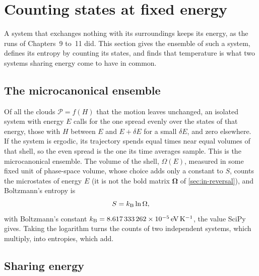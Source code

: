\section{Counting states at fixed energy}
\label{sec:sm-micro}

A system that exchanges nothing with its surroundings keeps its energy,
as the runs of Chapters~9 to~11 did. This section gives the ensemble of
such a system, defines its entropy by counting its states, and finds that
temperature is what two systems sharing energy come to have in common.

\subsection*{The microcanonical ensemble}

Of all the clouds $\mathcal{P} = f(H)$ that the motion leaves unchanged, an
isolated system with energy $E$ calls for the one spread evenly over the
states of that energy, those with $H$ between $E$ and $E + \delta E$ for a
small $\delta E$, and zero elsewhere. If the system is ergodic, its
trajectory spends equal times near equal volumes of that shell, so the
even spread is the one its time averages sample. This is the
microcanonical ensemble. The volume of the shell, $\Omega(E)$, measured in
some fixed unit of phase-space volume, whose choice adds only a constant
to $S$,
counts the microstates of energy $E$ (it is not the bold matrix
$\boldsymbol\Omega$ of \cref{sec:in-reversal}), and Boltzmann's entropy is
\begin{equation}
   S = k_{\mathrm{B}}\ln\Omega ,
   \label{eq:sm-entropy}
\end{equation}
with Boltzmann's constant $k_{\mathrm{B}} = \SI{8.617333262e-5}{\electronvolt\per
\kelvin}$, the value SciPy gives. Taking the logarithm turns the counts of
two independent systems, which multiply, into entropies, which add.

\subsection*{Sharing energy}

